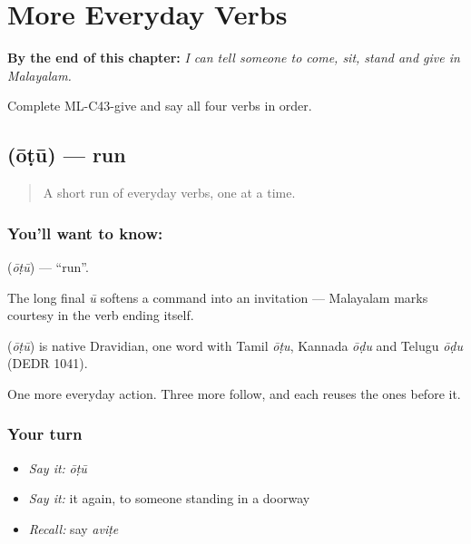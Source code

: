 
\chapter{More Everyday Verbs}
\label{ch:ml-more-verbs}

\begin{chapteropening}
\textbf{By the end of this chapter:} \emph{I can tell someone to come, sit, stand and give in Malayalam.}

Complete ML-C43-give and say all four verbs in order.
\end{chapteropening}

\section[\texorpdfstring{\ml{ഓടൂ} (ōṭū)}{ഓടൂ (ōṭū)}]{ (ōṭū) — run}

\label{lesson:ML-C43-run}



\begin{quote}
A short run of everyday verbs, one at a time.
\end{quote}

\subsection*{You'll want to know: }
\textbf{} (\emph{ōṭū}) — \textquotedblleft{}run\textquotedblright{}.

The long final \emph{ū} softens a command into an invitation — Malayalam marks courtesy in the verb ending itself.

\begin{cousinweb}
\textbf{} (\emph{ōṭū}) is native Dravidian, one word with Tamil \emph{ōṭu}, Kannada \emph{ōḍu} and Telugu \emph{ōḍu} (DEDR 1041).
\end{cousinweb}

\begin{grammarlens}[title={What you've built}]
One more everyday action. Three more follow, and each reuses the ones before it.
\end{grammarlens}

\subsection*{Your turn}
\begin{itemize}
\raggedright
  \item \emph{Say it:} \emph{ōṭū}
  \item \emph{Say it:} it again, to someone standing in a doorway
  \item \emph{Recall:} say \emph{aviṭe}
\end{itemize}

